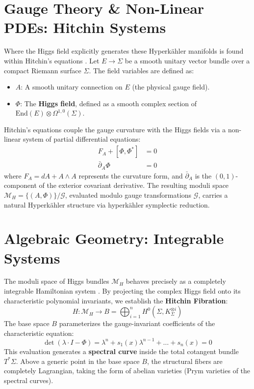 \documentclass[11pt,a4paper]{article}
\newcommand{\End}{\text{End}}
\newcommand{\Mcal}{\mathcal{M}}
\newcommand{\Gcal}{\mathcal{G}}
\newcommand{\pbar}{\bar{\partial}}
\begin{document}
\section{Gauge Theory \& Non-Linear PDEs: Hitchin Systems}
Where the Higgs field explicitly generates these Hyperk\"ahler manifolds is found within Hitchin's equations \cite{hitchin1987}. Let $E \to \Sigma$ be a smooth unitary vector bundle over a compact Riemann surface $\Sigma$. The field variables are defined as:
\begin{itemize}
    \item $A$: A smooth unitary connection on $E$ (the physical gauge field).
    \item $\Phi$: The \textbf{Higgs field}, defined as a smooth complex section of $\End(E) \otimes \Omega^{1,0}(\Sigma)$.
\end{itemize}

Hitchin's equations couple the gauge curvature with the Higgs fields via a non-linear system of partial differential equations:
\begin{align}
    F_A + [\Phi, \Phi^*] &= 0 \\
    \pbar_A \Phi &= 0
\end{align}
where $F_A = dA + A \wedge A$ represents the curvature form, and $\pbar_A$ is the $(0,1)$-component of the exterior covariant derivative. The resulting moduli space $\Mcal_H = \{(A, \Phi)\} / \Gcal$, evaluated modulo gauge transformations $\Gcal$, carries a natural Hyperk\"ahler structure via hyperk\"ahler symplectic reduction.

\section{Algebraic Geometry: Integrable Systems}
The moduli space of Higgs bundles $\Mcal_H$ behaves precisely as a completely integrable Hamiltonian system \cite{donagi1996}. By projecting the complex Higgs field onto its characteristic polynomial invariants, we establish the \textbf{Hitchin Fibration}:
\begin{equation}
    H: \Mcal_H \longrightarrow B = \bigoplus_{i=1}^n H^0(\Sigma, K_\Sigma^{\otimes i})
\end{equation}
The base space $B$ parameterizes the gauge-invariant coefficients of the characteristic equation:
\begin{equation}
    \det(\lambda \cdot I - \Phi) = \lambda^n + s_1(x)\lambda^{n-1} + \dots + s_n(x) = 0
\end{equation}
This evaluation generates a \textbf{spectral curve} inside the total cotangent bundle $T^*\Sigma$. Above a generic point in the base space $B$, the structural fibers are completely Lagrangian, taking the form of abelian varieties (Prym varieties of the spectral curves). 
\end{document}
